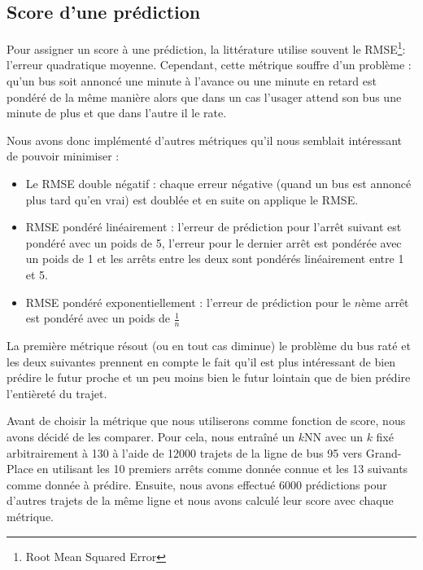 \documentclass[letterpaper]{article}
\begin{document}
\subsection{Score d'une prédiction}
Pour assigner un score à une prédiction, la littérature utilise souvent le RMSE\footnote{Root Mean Squared Error}: l'erreur quadratique moyenne.
Cependant, cette métrique souffre d'un problème :
qu'un bus soit annoncé une minute à l'avance ou une minute en retard est pondéré de la même manière alors que dans un cas l'usager attend son bus une minute de plus et que dans l'autre il le rate.

Nous avons donc implémenté d'autres métriques qu'il nous semblait intéressant de pouvoir minimiser :
\begin{itemize}
    \item Le RMSE double négatif : chaque erreur négative (quand un bus est annoncé plus tard qu'en vrai) est doublée et en suite on applique le RMSE.
    \item RMSE pondéré linéairement : l'erreur de prédiction pour l'arrêt suivant est pondéré avec un poids de 5, l'erreur pour le dernier arrêt est pondérée avec un poids de 1 et les arrêts entre les deux sont pondérés linéairement entre 1 et 5.
    \item RMSE pondéré exponentiellement : l'erreur de prédiction pour le $n$ème arrêt est pondéré avec un poids de $\frac{1}{n}$
\end{itemize}
\vspace{1em}

La première métrique résout (ou en tout cas diminue) le problème du bus raté et les deux suivantes prennent en compte le fait qu'il est plus intéressant de bien prédire le futur proche et un peu moins bien le futur lointain que de bien prédire l'entièreté du trajet.

Avant de choisir la métrique que nous utiliserons comme fonction de score, nous avons décidé de les comparer.
Pour cela, nous entraîné un $k$NN avec un $k$ fixé arbitrairement à 130 à l'aide de 12000 trajets de la ligne de bus 95 vers Grand-Place en utilisant les 10 premiers arrêts comme donnée connue et les 13 suivants comme donnée à prédire. Ensuite, nous avons effectué 6000 prédictions pour d'autres trajets de la même ligne et nous avons calculé leur score avec chaque métrique.
\end{document}
